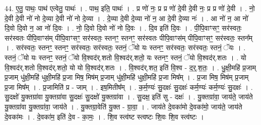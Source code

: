\documentclass[17pt]{extarticle}
\begin{document}
44. ए॒तु॒ पाथः॒ पाथ॑ एत्वेतु॒ पाथः॑ । . पाथ॒ इति॒ पाथः॑ । . प्र णो॑ नः॒ प्र प्र णो॑ दे॒वी दे॒वी नः॒ प्र प्र णो॑ दे॒वी । . नो॒ दे॒वी दे॒वी नो॑ नो दे॒व्या दे॒वी नो॑ नो दे॒व्या । . दे॒व्या दे॒वी दे॒व्या नो॑ न॒ आ दे॒वी दे॒व्या नः॑ । . आ नो॑ न॒ आ नो॑ दि॒वो दि॒वो न॒ आ नो॑ दि॒वः । . नो॒ दि॒वो दि॒वो नो॑ नो दि॒वः । . दि॒व इति॑ दि॒वः । . पी॒पि॒वाꣳसꣳ॒॒ सर॑स्वतः॒ सर॑स्वतः पीपि॒वाꣳस॑म् पीपि॒वाꣳसꣳ॒॒ सर॑स्वतः॒ स्तनꣳ॒॒ स्तनꣳ॒॒ सर॑स्वतः पीपि॒वाꣳस॑म् पीपि॒वाꣳसꣳ॒॒ सर॑स्वतः॒ स्तन᳚म् । . सर॑स्वतः॒ स्तनꣳ॒॒ स्तनꣳ॒॒ सर॑स्वतः॒ सर॑स्वतः॒ स्तनं॒ ॅयो यः स्तनꣳ॒॒ सर॑स्वतः॒ सर॑स्वतः॒ स्तनं॒ ॅयः । . स्तनं॒ ॅयो यः स्तनꣳ॒॒ स्तनं॒ ॅयो वि॒श्वद॑र्.शतो वि॒श्वद॑र्.शतो॒ यः स्तनꣳ॒॒ स्तनं॒ ॅयो वि॒श्वद॑र्.शतः । . यो वि॒श्वद॑र्.शतो वि॒श्वद॑र्.शतो॒ यो यो वि॒श्वद॑र्.शतः । . वि॒श्वद॑र्.शत॒ इति॑ वि॒श्व - द॒र्॒.श॒तः॒ । . धु॒क्षी॒महि॑ प्र॒जाम् प्र॒जाम् धु॑क्षी॒महि॑ धुक्षी॒महि॑ प्र॒जा मिष॒ मिष॑म् प्र॒जाम् धु॑क्षी॒महि॑ धुक्षी॒महि॑ प्र॒जा मिष᳚म् । . प्र॒जा मिष॒ मिष॑म् प्र॒जाम् प्र॒जा मिष᳚म् । . प्र॒जामिति॑ प्र - जाम् । . इष॒मितीष᳚म् । . क॒र्म॒ण्यः॑ सु॒दक्षः॑ सु॒दक्षः॑ कर्म॒ण्यः॑ कर्म॒ण्यः॑ सु॒दक्षः॑ । . सु॒दक्षो॑ यु॒क्तग्रा॑वा यु॒क्तग्रा॑वा सु॒दक्षः॑ सु॒दक्षो॑ यु॒क्तग्रा॑वा । . सु॒दक्ष॒ इति॑ सु - दक्षः॑ । . यु॒क्तग्रा॑वा॒ जाय॑ते॒ जाय॑ते यु॒क्तग्रा॑वा यु॒क्तग्रा॑वा॒ जाय॑ते । . यु॒क्तग्रा॒वेति॑ यु॒क्त - ग्रा॒वा॒ । . जाय॑ते दे॒वका॑मो दे॒वका॑मो॒ जाय॑ते॒ जाय॑ते दे॒वका॑मः । . दे॒वका॑म॒ इति॑ दे॒व - का॒मः॒ । . शि॒व स्त्व॑ष्ट स्त्वष्टः शि॒वः शि॒व स्त्व॑ष्टः । \newline
\end{document}
